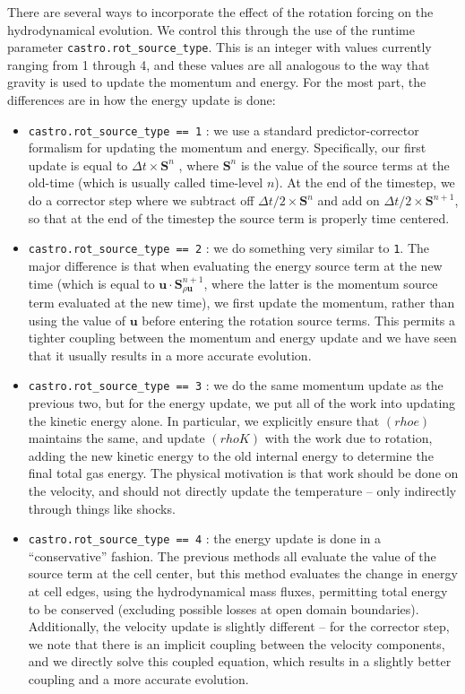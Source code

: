 There are several ways to incorporate the effect of the rotation
forcing on the hydrodynamical evolution. We control this through the
use of the runtime parameter {\tt castro.rot\_source\_type}. This is
an integer with values currently ranging from 1 through 4, and these
values are all analogous to the way that gravity is used to update the
momentum and energy. For the most part, the differences are in how the
energy update is done:
\begin{itemize}

\item {\tt castro.rot\_source\_type == 1} :  we use a standard
  predictor-corrector formalism for updating the momentum and
  energy. Specifically, our first update is equal to $\Delta t \times
  \mathbf{S}^n$ , where $\mathbf{S}^n$ is the value of the source
  terms at the old-time (which is usually called time-level $n$).  At
  the end of the timestep, we do a corrector step where we subtract
  off $\Delta t / 2 \times \mathbf{S}^n$ and add on $\Delta t / 2
  \times \mathbf{S}^{n+1}$, so that at the end of the timestep the
  source term is properly time centered.

\item {\tt castro.rot\_source\_type == 2} : we do something very
  similar to {\tt 1}. The major difference is that when evaluating the
  energy source term at the new time (which is equal to $\mathbf{u}
  \cdot \mathbf{S}^{n+1}_{\rho \mathbf{u}}$, where the latter is the
  momentum source term evaluated at the new time), we first update the
  momentum, rather than using the value of $\mathbf{u}$ before
  entering the rotation source terms. This permits a tighter coupling
  between the momentum and energy update and we have seen that it
  usually results in a more accurate evolution.

\item {\tt castro.rot\_source\_type == 3} : we do the same momentum
  update as the previous two, but for the energy update, we put all of
  the work into updating the kinetic energy alone. In particular, we
  explicitly ensure that $(rho e)$ maintains the same, and update
  $(rho K)$ with the work due to rotation, adding the new kinetic
  energy to the old internal energy to determine the final total gas
  energy.  The physical motivation is that work should be done on the
  velocity, and should not directly update the temperature -- only
  indirectly through things like shocks.

\item {\tt castro.rot\_source\_type == 4} : the energy update is done
  in a ``conservative'' fashion.  The previous methods all evaluate
  the value of the source term at the cell center, but this method
  evaluates the change in energy at cell edges, using the
  hydrodynamical mass fluxes, permitting total energy to be conserved
  (excluding possible losses at open domain boundaries). Additionally,
  the velocity update is slightly different -- for the corrector step,
  we note that there is an implicit coupling between the velocity
  components, and we directly solve this coupled equation, which
  results in a slightly better coupling and a more accurate evolution.
\end{itemize}

